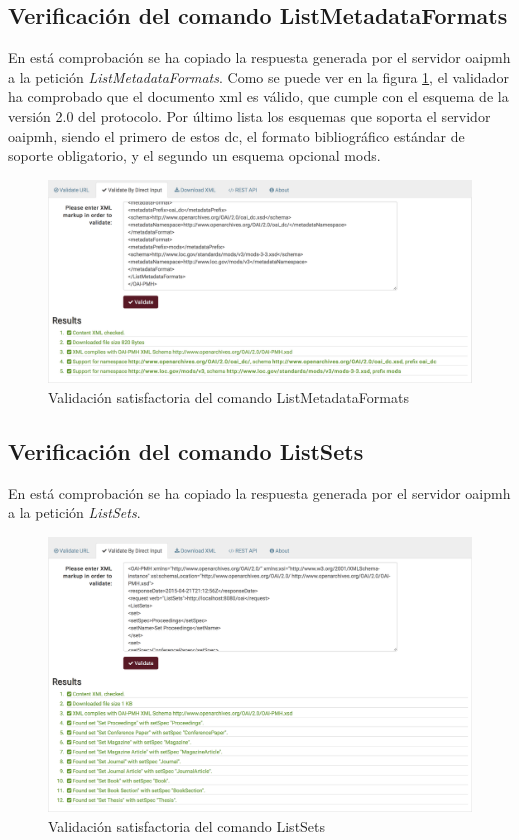 \subsection{Verificación del comando ListMetadataFormats}

En está comprobación se ha copiado la respuesta generada por el servidor \acrshort{oaipmh} a la petición \textit{ListMetadataFormats}. Como se puede ver en la figura \ref{fig:listmetadataformats}, el validador ha comprobado que el documento \acrshort{xml} es válido, que cumple con el esquema de la versión 2.0 del protocolo. Por último lista los esquemas que soporta el servidor \acrshort{oaipmh}, siendo el primero de estos \acrlong{dc}, el formato bibliográfico estándar de soporte obligatorio, y el segundo un esquema opcional \acrfull{mods}\cite{MODS}.

\begin{figure}[!htbp]
	\centering
	\includegraphics[scale=0.31]{fig/oaipmh_validations/ListMetadataFormats}
	\caption{Validación satisfactoria del comando ListMetadataFormats}
	\label{fig:listmetadataformats}
\end{figure}

\subsection{Verificación del comando ListSets}

En está comprobación se ha copiado la respuesta generada por el servidor \acrshort{oaipmh} a la petición \textit{ListSets}. 

\begin{figure}[!htbp]
	\centering
	\includegraphics[scale=0.31]{fig/oaipmh_validations/ListSets}
	\caption{Validación satisfactoria del comando ListSets}
	\label{fig:listsets}
\end{figure}

